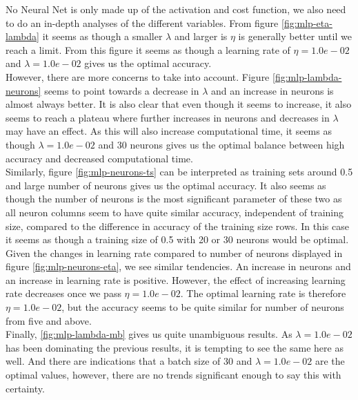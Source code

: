 \documentclass[11pt]{article}
\begin{document}
No Neural Net is only made up of the activation and cost function, we also need to do an in-depth analyses of the different variables. From figure \ref{fig:mlp-eta-lambda} it seems as though a smaller $\lambda$ and larger is $\eta$ is generally better until we reach a limit. From this figure it seems as though a learning rate of $\eta = 1.0e-02$ and $\lambda = 1.0e-02$ gives us the optimal accuracy. \\ 
However, there are more concerns to take into account. Figure \ref{fig:mlp-lambda-neurons} seems to point towards a decrease in $\lambda$ and an increase in neurons is almost always better. It is also clear that even though it seems to increase, it also seems to reach a plateau where further increases in neurons and decreases in $\lambda$ may have an effect. As this will also increase computational time, it seems as though $\lambda = 1.0e-02$ and 30 neurons gives us the optimal balance between high accuracy and decreased computational time. \\
Similarly, figure \ref{fig:mlp-neurons-ts} can be interpreted as training sets around 0.5 and large number of neurons gives us the optimal accuracy. It also seems as though the number of neurons is the most significant parameter of these two as all neuron columns seem to have quite similar accuracy, independent of training size, compared to the difference in accuracy of the training size rows. In this case it seems as though a training size of 0.5 with 20 or 30 neurons would be optimal. \\
Given the changes in learning rate compared to number of neurons displayed in figure \ref{fig:mlp-neurons-eta}, we see similar tendencies. An increase in neurons and an increase in learning rate is positive. However, the effect of increasing learning rate decreases once we pass $\eta = 1.0e-02$. The optimal learning rate is therefore $\eta = 1.0e-02$, but the accuracy seems to be quite similar for number of neurons from five and above. \\ 
Finally, \ref{fig:mlp-lambda-mb} gives us quite unambiguous results. As $\lambda = 1.0e-02$ has been dominating the previous results, it is tempting to see the same here as well. And there are indications that a batch size of 30 and $\lambda = 1.0e-02$ are the optimal values, however, there are no trends significant enough to say this with certainty. \\ \\
\end{document}
